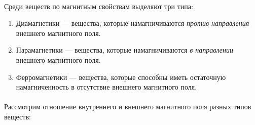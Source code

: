 \documentclass[dvipdfmx]{article}
\begin{document}
\paragraph{}

Среди веществ по магнитным свойствам выделяют три типа:

\begin{enumerate}
\item
  Диамагнетики --- вещества, которые намагничиваются \textit{против направления} внешнего магнитного поля.
\item
  Парамагнетики --- вещества, которые намагничиваются \textit{в направлении} внешнего магнитного поля.
\item
  Ферромагнетики --- вещества, которые способны иметь остаточную намагниченность в отсутствие внешнего магнитного поля.
\end{enumerate}
\paragraph{}

Рассмотрим отношение внутреннего и внешнего магнитного поля разных типов веществ:
\end{document}
